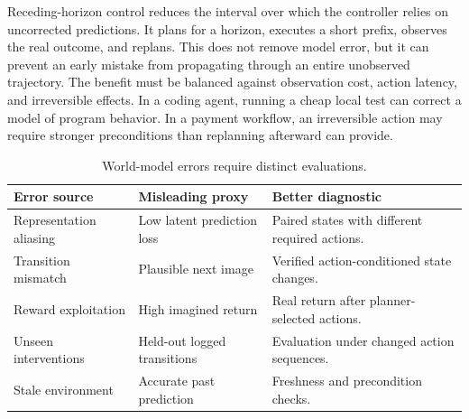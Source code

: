 Receding-horizon control reduces the interval over which the controller relies on uncorrected predictions. It plans for a horizon, executes a short prefix, observes the real outcome, and replans. This does not remove model error, but it can prevent an early mistake from propagating through an entire unobserved trajectory. The benefit must be balanced against observation cost, action latency, and irreversible effects. In a coding agent, running a cheap local test can correct a model of program behavior. In a payment workflow, an irreversible action may require stronger preconditions than replanning afterward can provide.

{\small\setlength{\tabcolsep}{3pt}
\begin{table}[!htbp]
\centering
\caption{World-model errors require distinct evaluations.}\label{tab:C06:errors}
\begin{tabular}{L{29mm}L{37mm}L{40mm}}

\toprule Error source & Misleading proxy & Better diagnostic\\\midrule
Representation aliasing & Low latent prediction loss & Paired states with different required actions.\\
Transition mismatch & Plausible next image & Verified action-conditioned state changes.\\
Reward exploitation & High imagined return & Real return after planner-selected actions.\\
Unseen interventions & Held-out logged transitions & Evaluation under changed action sequences.\\
Stale environment & Accurate past prediction & Freshness and precondition checks.\\
\bottomrule
\end{tabular}
\end{table}
}

